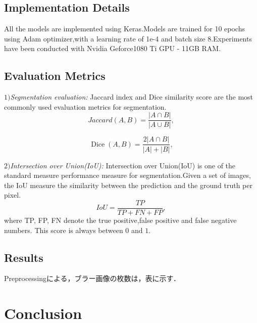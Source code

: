 \documentclass{article}
\begin{document}
\subsection{Implementation Details}
All the models are implemented using Keras.Models are trained for 10 epochs using Adam optimizer,with a learning rate of 1e-4 and batch size 8.Experiments have been conducted with Nvidia Geforce1080 Ti GPU - 11GB RAM.
\subsection{Evaluation Metrics}
\(1)\){\it Segmentation  evaluation: }Jaccard index and Dice similarity score are the most commonly used evaluation metrics for segmentation.
\begin{equation}
J a c c a r d(A, B)=\frac{|A \cap B|}{|A \cup B|},
\end{equation}

\begin{equation}
\operatorname{Dice}(A, B)=\frac{2|A \cap B|}{|A|+|B|},
\end{equation}

\(2)\){\it Intersection over Union(IoU): } Intersection over Union(IoU) is one of the standard measure performance measure for segmentation.Given a set of images, the IoU measure the similarity between the prediction and the ground truth per pixel.
\begin{equation}
IoU=\frac{TP}{TP+FN+FP},
\end{equation}
where TP, FP, FN denote the true positive,false positive and false negative numbers. This score is always between $0$ and $1$.
\subsection{Results}
Preprocessingによる，ブラー画像の枚数は，表に示す．
\section{Conclusion}
\label{sec:con}
\end{document}
